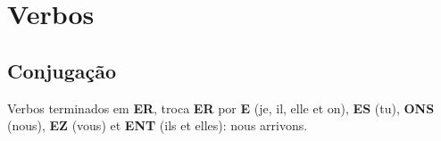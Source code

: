 \section{Verbos}
\subsection{Conjugação}
Verbos terminados em \textbf{ER}, troca \textbf{ER} por \textbf{E} (je, il, elle et on), \textbf{ES} (tu), \textbf{ONS} (nous), \textbf{EZ} (vous) et \textbf{ENT} (ils et elles): nous arrivons.
